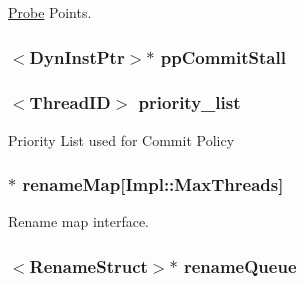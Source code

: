 \label{classDefaultCommit_ae41ff03242cc6980c072e3ea824168ed}
\hyperlink{namespaceProbe}{Probe} Points. \hypertarget{classDefaultCommit_a3c0bfd67f137dbd48bc31ade04a09cf0}{
\subsubsection[{ppCommitStall}]{$<${\bf DynInstPtr}$>$$\ast$ {\bf ppCommitStall}}}
\label{classDefaultCommit_a3c0bfd67f137dbd48bc31ade04a09cf0}
\hypertarget{classDefaultCommit_a4d358db7156d04e20b3269a53334dd19}{
\subsubsection[{priority\_\-list}]{$<${\bf ThreadID}$>$ {\bf priority\_\-list}}}
\label{classDefaultCommit_a4d358db7156d04e20b3269a53334dd19}
Priority List used for Commit Policy \hypertarget{classDefaultCommit_ac305c101c17d28451cc1f023b187b08b}{
\subsubsection[{renameMap}]{$\ast$ {\bf renameMap}\mbox{[}Impl::MaxThreads\mbox{]}}}
\label{classDefaultCommit_ac305c101c17d28451cc1f023b187b08b}
Rename map interface. \hypertarget{classDefaultCommit_ae9b536282159ba75153a223be77515ba}{
\subsubsection[{renameQueue}]{$<${\bf RenameStruct}$>$$\ast$ {\bf renameQueue}}}
